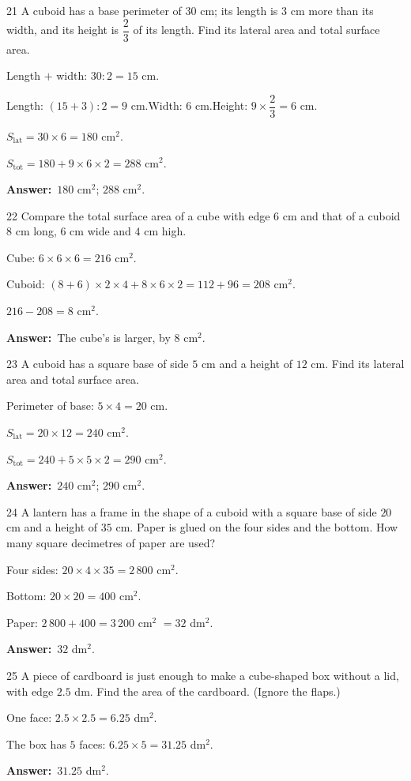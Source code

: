 \documentclass[11pt]{article}
\newif\ifsol \solfalse
\providecommand{\AnsWord}{Đáp số}
\newcommand{\dapso}[1]{\par\textbf{\AnsWord:}\ #1}
\newcommand{\probsol}[1]{%
  \begin{lrbox}{\solmeasure}\begin{minipage}{\dimexpr\linewidth-24pt\relax}#1\end{minipage}\end{lrbox}%
  \ifsol
    \begin{solbox}#1\end{solbox}%
  \else
    \setlength{\solht}{\dimexpr\ht\solmeasure+\dp\solmeasure+0.85cm\relax}%
    \ifdim\solht<1.35cm\setlength{\solht}{1.35cm}\fi
    \begin{tcolorbox}[colback=white,colframe=Line,boxrule=0.8pt,arc=5pt,
      left=8pt,right=8pt,top=4pt,bottom=4pt,height=\solht]{\footnotesize\color{Slate}\itshape\WorkWord}\end{tcolorbox}%
  \fi}
\newcommand{\gap}{\vspace{0.3cm}}
\def\WorkWord{Your work:}
\def\AnsWord{Answer}
\begin{document}
\gap
\begin{probbox}{21}{\relax}
A cuboid has a base perimeter of $30$ cm; its length is $3$ cm more than its width, and its height is $\dfrac23$ of its length. Find its lateral area and total surface area.
\end{probbox}
\probsol{
Length $+$ width: $30:2=15$ cm.\par
Length: $(15+3):2=9$ cm.\quad Width: $6$ cm.\quad Height: $9\times\dfrac23=6$ cm.\par
$S_{\text{lat}}=30\times6=180$ cm$^2$.\par
$S_{\text{tot}}=180+9\times6\times2=288$ cm$^2$.
\dapso{$180$ cm$^2$; $288$ cm$^2$.}}
\gap
\begin{probbox}{22}{\relax}
Compare the total surface area of a cube with edge $6$ cm and that of a cuboid $8$ cm long, $6$ cm wide and $4$ cm high.
\end{probbox}
\probsol{
Cube: $6\times6\times6=216$ cm$^2$.\par
Cuboid: $(8+6)\times2\times4+8\times6\times2=112+96=208$ cm$^2$.\par
$216-208=8$ cm$^2$.
\dapso{The cube's is larger, by $8$ cm$^2$.}}
\gap
\begin{probbox}{23}{\relax}
A cuboid has a square base of side $5$ cm and a height of $12$ cm. Find its lateral area and total surface area.
\end{probbox}
\probsol{
Perimeter of base: $5\times4=20$ cm.\par
$S_{\text{lat}}=20\times12=240$ cm$^2$.\par
$S_{\text{tot}}=240+5\times5\times2=290$ cm$^2$.
\dapso{$240$ cm$^2$; $290$ cm$^2$.}}
\gap
\begin{probbox}{24}{\relax}
A lantern has a frame in the shape of a cuboid with a square base of side $20$ cm and a height of $35$ cm. Paper is glued on the four sides and the bottom. How many square decimetres of paper are used?
\end{probbox}
\probsol{
Four sides: $20\times4\times35=2\,800$ cm$^2$.\par
Bottom: $20\times20=400$ cm$^2$.\par
Paper: $2\,800+400=3\,200$ cm$^2$ $=32$ dm$^2$.
\dapso{$32$ dm$^2$.}}
\gap
\begin{probbox}{25}{\relax}
A piece of cardboard is just enough to make a cube-shaped box without a lid, with edge $2.5$ dm. Find the area of the cardboard. (Ignore the flaps.)
\end{probbox}
\probsol{
One face: $2.5\times2.5=6.25$ dm$^2$.\par
The box has $5$ faces: $6.25\times5=31.25$ dm$^2$.
\dapso{$31.25$ dm$^2$.}}
\end{document}
